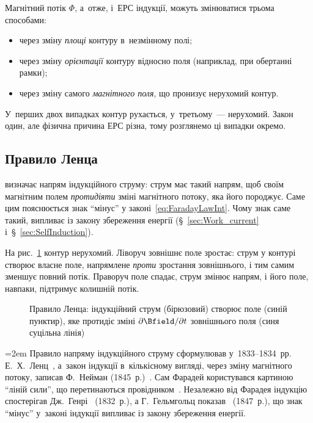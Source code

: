 Магнітний потік $\Phi$, а~отже, і~ЕРС індукції, можуть змінюватися трьома способами:
\begin{itemize}
	\item через зміну \emph{площі} контуру в~незмінному полі;
	\item через зміну \emph{орієнтації} контуру відносно поля (наприклад, при обертанні
	      рамки);
	\item через зміну самого \emph{магнітного поля}, що пронизує нерухомий контур.
\end{itemize}
У~перших двох випадках контур рухається, у~третьому~--- нерухомий. Закон один, але фізична причина ЕРС різна, тому розглянемо ці
випадки окремо.

\subsection*{Правило Ленца}

 визначає напрям індукційного струму: струм має такий напрям,
щоб своїм магнітним полем \emph{протидіяти} зміні магнітного потоку, яка його породжує.
Саме цим пояснюється знак \enquote{мінус} у законі~\eqref{eq:FaradayLawInt}. Чому знак саме такий, випливає
із закону збереження енергії (\S~\ref{sec:Work_current} і~\S~\ref{sec:SelfInduction}).

На рис.~\ref{pic:LenzRule} контур нерухомий. Ліворуч зовнішнє поле зростає: струм у контурі
створює власне поле, напрямлене \emph{проти} зростання зовнішнього, і тим самим зменшує повний потік.
Праворуч поле спадає, струм змінює напрям, і його поле, навпаки, підтримує колишній потік.

\begin{figure}[h!]\centering
	\caption{Правило Ленца: індукційний струм (бірюзовий) створює поле (синій пунктир), яке протидіє зміні $\partial\Bfield/\partial t$ зовнішнього поля
		(синя суцільна лінія)\label{pic:LenzRule}}
\end{figure}

\begin{Historical}[unbreakable]
	\emergencystretch=2em
	Правило напряму індукційного струму сформулював у~1833--1834~рр. Е.~Х.~Ленц~\cite{Lenz1834}, а~закон
	індукції в~кількісному вигляді, через зміну магнітного потоку, записав Ф.~Нейман
	(1845~р.)~\cite{Neumann1846}. Сам Фарадей користувався картиною \enquote{ліній сили}, що перетинаються
	провідником~\cite{Faraday1832}. Незалежно від Фарадея індукцію спостерігав Дж.~Генрі~\cite{Henry1832} (1832~р.), а
	Г.~Гельмгольц показав~\cite{Helmholtz1847} (1847~р.), що знак \enquote{мінус} у~законі індукції випливає із
	закону збереження енергії.
\end{Historical}




